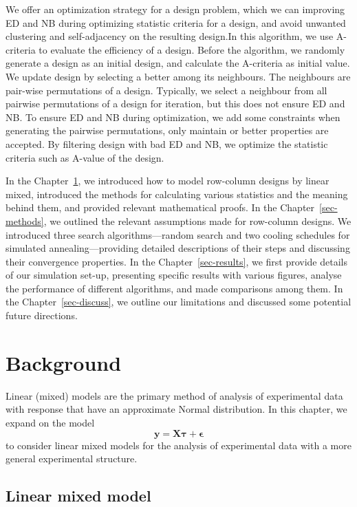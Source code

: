 \documentclass[
  a4paper,
  oneside,
  openany,
  12pt,
  onecolumn]{book}
\theoremstyle{definition}
\theoremstyle{definition}
\theoremstyle{plain}
\theoremstyle{remark}
\begin{document}
We offer an optimization strategy for a design problem, which we can
improving ED and NB during optimizing statistic criteria for a design,
and avoid unwanted clustering and self-adjacency on the resulting
design.In this algorithm, we use A-criteria to evaluate the efficiency
of a design. Before the algorithm, we randomly generate a design as an
initial design, and calculate the A-criteria as initial value. We update
design by selecting a better among its neighbours. The neighbours are
pair-wise permutations of a design. Typically, we select a neighbour
from all pairwise permutations of a design for iteration, but this does
not ensure ED and NB. To ensure ED and NB during optimization, we add
some constraints when generating the pairwise permutations, only
maintain or better properties are accepted. By filtering design with bad
ED and NB, we optimize the statistic criteria such as A-value of the
design.

In the Chapter~\ref{sec-bg}, we introduced how to model row-column
designs by linear mixed, introduced the methods for calculating various
statistics and the meaning behind them, and provided relevant
mathematical proofs. In the Chapter~\ref{sec-methods}, we outlined the
relevant assumptions made for row-column designs. We introduced three
search algorithms---random search and two cooling schedules for
simulated annealing---providing detailed descriptions of their steps and
discussing their convergence properties. In the
Chapter~\ref{sec-results}, we first provide details of our simulation
set-up, presenting specific results with various figures, analyse the
performance of different algorithms, and made comparisons among them. In
the Chapter~\ref{sec-discuss}, we outline our limitations and discussed
some potential future directions.


\chapter{Background}\label{sec-bg}

Linear (mixed) models are the primary method of analysis of experimental
data with response that have an approximate Normal distribution. In this
chapter, we expand on the model
\[\boldsymbol{y}=\boldsymbol{X}\boldsymbol{\tau} + \boldsymbol{\epsilon}\]
to consider linear mixed models for the analysis of experimental data
with a more general experimental structure.

\section{Linear mixed model}\label{linear-mixed-model}
\end{document}
